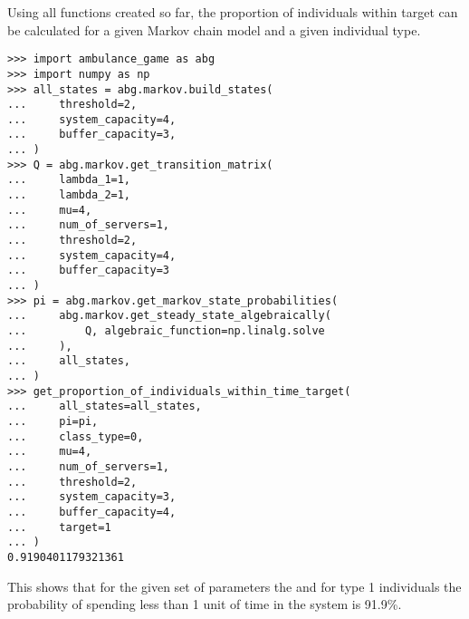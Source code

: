 Using all functions created so far, the proportion of individuals within target
can be calculated for a given Markov chain model and a given individual type.

\begin{lstlisting}[style=pystyle]
>>> import ambulance_game as abg
>>> import numpy as np
>>> all_states = abg.markov.build_states(
...     threshold=2,
...     system_capacity=4,
...     buffer_capacity=3,
... )
>>> Q = abg.markov.get_transition_matrix(
...     lambda_1=1,
...     lambda_2=1,
...     mu=4,
...     num_of_servers=1,
...     threshold=2,
...     system_capacity=4,
...     buffer_capacity=3
... )
>>> pi = abg.markov.get_markov_state_probabilities(
...     abg.markov.get_steady_state_algebraically(
...         Q, algebraic_function=np.linalg.solve
...     ),
...     all_states,
... )
>>> get_proportion_of_individuals_within_time_target(
...     all_states=all_states,
...     pi=pi,
...     class_type=0,
...     mu=4,
...     num_of_servers=1,
...     threshold=2,
...     system_capacity=3,
...     buffer_capacity=4,
...     target=1
... )
0.9190401179321361

\end{lstlisting}

This shows that for the given set of parameters the and for type 1 individuals
the probability of spending less than 1 unit of time in the system is 91.9\%.